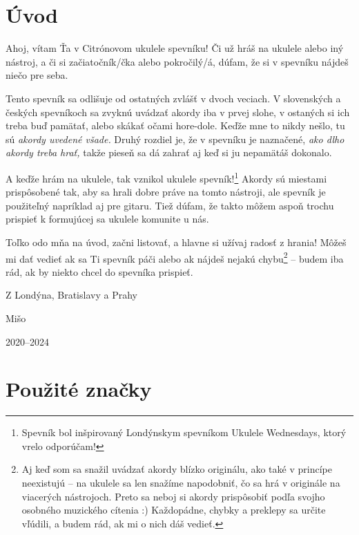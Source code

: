 \begingroup %
\setlength{\parindent}{0pt}
\setlength{\parskip}{\baselineskip}
\def\arraystretch{1.7}%
\setlength{\arrayrulewidth}{0.3mm}
\large

\section*{Úvod}

Ahoj, vítam Ťa v Citrónovom ukulele spevníku! Či už hráš na ukulele alebo iný nástroj,
a či si začiatočník/čka alebo pokročilý/á, dúfam, že si v spevníku nájdeš niečo pre seba.

Tento spevník sa odlišuje od ostatných zvlášť v dvoch veciach. V slovenských a českých
spevníkoch sa zvyknú uvádzať akordy iba v prvej slohe, v ostaných si ich treba buď
pamätať, alebo skákať očami hore-dole. Keďže mne to nikdy nešlo, tu sú
\emph{akordy uvedené všade.} Druhý rozdiel je, že v spevníku je naznačené,
\emph{ako dlho akordy treba hrať,} takže pieseň sa dá zahrať aj keď si ju
nepamätáš dokonalo.

A keďže hrám na ukulele, tak vznikol ukulele spevník!\footnote{Spevník bol inšpirovaný
Londýnskym spevníkom Ukulele Wednesdays, ktorý vrelo odporúčam!} Akordy sú miestami
prispôsobené tak, aby sa hrali dobre práve na tomto nástroji, ale spevník je použiteľný
napríklad aj pre gitaru. Tiež dúfam, že takto môžem aspoň trochu prispieť k formujúcej
sa ukulele komunite u nás.

Toľko odo mňa na úvod, začni listovať, a hlavne si užívaj radosť z hrania! Môžeš
mi dať vedieť ak sa Ti spevník páči alebo ak nájdeš nejakú chybu\footnote{
Aj keď som sa snažil uvádzať akordy blízko originálu,  ako také
v princípe neexistujú -- na ukulele sa len snažíme napodobniť, čo sa hrá v originále
na viacerých nástrojoch. Preto sa neboj si akordy prispôsobiť podľa svojho osobného
muzického cítenia :) Každopádne, chybky a preklepy sa určite vľúdili, a budem rád,
ak mi o nich dáš vedieť.
}
-- budem iba rád,
ak by niekto chcel do spevníka prispieť.

Z Londýna, Bratislavy a Prahy

{
\hspace{1cm}
Mišo

\vspace{-0.3cm}
\hspace{1cm}
2020--2024
}

\newpage
\section*{Použité značky}

